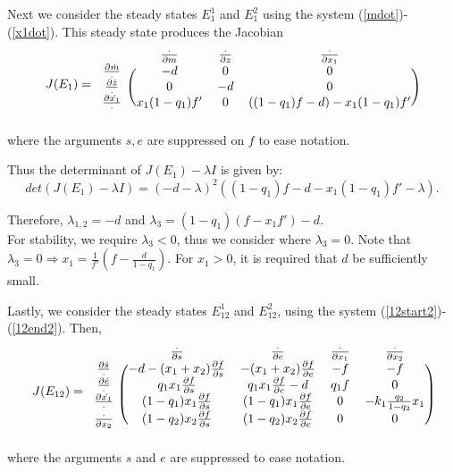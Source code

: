 \documentclass[12pt]{article}
\begin{document}
\noindent Next we consider the steady states $E_1^1$ and $E_1^2$ using the system (\ref{mdot})-(\ref{x1dot}). This steady state produces the Jacobian 
\[
J(E_1) = \begin{blockarray}{cccc}
 & \frac{\cdot}{\partial m} & \frac{\cdot}{\partial z} & \frac{\cdot}{\partial x_1} \\
\begin{block}{c(ccc)}
\frac{\partial \dot{m}}{\cdot} & -d & 0 & 0 \\
\frac{\partial \dot{z}}{\cdot} & 0 & -d & 0 \\
\frac{\partial \dot{x_1}}{\cdot} & x_1 (1-q_1)f' & 0 & ((1-q_1)f-d)-x_1(1-q_1)f' \\
\end{block}
\end{blockarray}
\]
where the arguments $s,e$ are suppressed on $f$ to ease notation.

\noindent Thus the determinant of $J(E_1)-\lambda I$ is given by: $$det(J(E_1)-\lambda I)=(-d-\lambda )^2 ((1-q_1)f-d-x_1(1-q_1)f'-\lambda).$$

\noindent Therefore, $\lambda_{1,2}=-d$ and $\lambda_3 = (1-q_1)(f-x_1 f') -d$. \\ 
\noindent For stability, we require $\lambda_3<0$, thus we consider where $\lambda_3 = 0.$ Note that $\lambda_3=0 \Rightarrow x_1 = \frac{1}{f'} (f-\frac{d}{1-q_1})$. For $x_1>0$, it is required that $d$ be sufficiently small.

\noindent Lastly, we consider the steady states $E_{12}^1$ and $E_{12}^2$, using the system (\ref{12start2})-(\ref{12end2}). Then, 
\[
J(E_{12}) = \begin{blockarray}{ccccc}
 & \frac{\cdot}{\partial s} & \frac{\cdot}{\partial e} & \frac{\cdot}{\partial x_1} & \frac{\cdot}{\partial x_2}\\
\begin{block}{c(cccc)}
\frac{\partial \dot{s}}{\cdot} & -d-(x_1 + x_2)\frac{\partial f}{\partial s} & -(x_1 + x_2)\frac{\partial f}{\partial e} & -f & -f \\
\frac{\partial \dot{e}}{\cdot} & q_1 x_1 \frac{\partial f}{\partial s} & q_1 x_1 \frac{\partial f}{\partial e}-d & q_1 f & 0 \\
\frac{\partial \dot{x_1}}{\cdot} & (1-q_1)x_1 \frac{\partial f}{\partial s} & (1-q_1)x_1 \frac{\partial f}{\partial e} & 0 & -k_1 \frac{q_2}{1-q_2} x_1 \\
\frac{\cdot}{\partial x_2} & (1-q_2)x_2 \frac{\partial f}{\partial s} & (1-q_2) x_2 \frac{\partial f}{\partial e} & 0 & 0\\
\end{block}
\end{blockarray}
\]
where the arguments $s$ and $e$ are suppressed to ease notation. 
\end{document}
